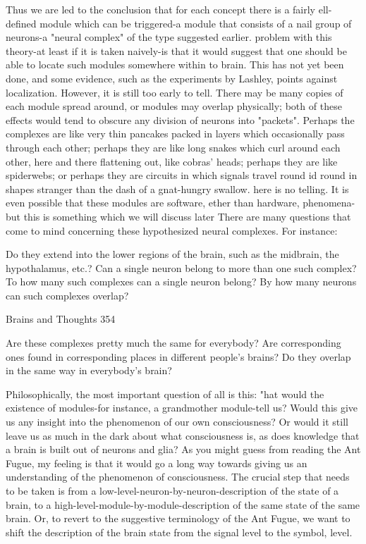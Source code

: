   Thus we are led to the conclusion that for each concept there is a fairly ell-defined
module which can be triggered-a module that consists of a nail group of neurons-a
"neural complex" of the type suggested earlier. problem with this theory-at least if it is
taken naively-is that it would suggest that one should be able to locate such modules
somewhere within to brain. This has not yet been done, and some evidence, such as the
experiments by Lashley, points against localization. However, it is still too early to tell.
There may be many copies of each module spread around, or modules may overlap
physically; both of these effects would tend to obscure any division of neurons into
"packets". Perhaps the complexes are like very thin pancakes packed in layers which
occasionally pass through each other; perhaps they are like long snakes which curl
around each other, here and there flattening out, like cobras' heads; perhaps they are like
spiderwebs; or perhaps they are circuits in which signals travel round id round in shapes
stranger than the dash of a gnat-hungry swallow. here is no telling. It is even possible that
these modules are software, ether than hardware, phenomena-but this is something which
we will discuss later
  There are many questions that come to mind concerning these hypothesized neural
complexes. For instance:

         Do they extend into the lower regions of the brain, such as the
            midbrain, the hypothalamus, etc.?
         Can a single neuron belong to more than one such complex?
         To how many such complexes can a single neuron belong?
         By how many neurons can such complexes overlap?




Brains and Thoughts                                                                      354

         Are these complexes pretty much the same for everybody?
         Are corresponding ones found in corresponding places in different
          people's brains?
         Do they overlap in the same way in everybody's brain?

  Philosophically, the most important question of all is this: "hat would the existence of
modules-for instance, a grandmother module-tell us? Would this give us any insight into
the phenomenon of our own consciousness? Or would it still leave us as much in the dark
about what consciousness is, as does knowledge that a brain is built out of neurons and
glia? As you might guess from reading the Ant Fugue, my feeling is that it would go a
long way towards giving us an understanding of the phenomenon of consciousness. The
crucial step that needs to be taken is from a low-level-neuron-by-neuron-description of
the state of a brain, to a high-level-module-by-module-description of the same state of the
same brain. Or, to revert to the suggestive terminology of the Ant Fugue, we want to shift
the description of the brain state from the signal level to the symbol, level.

